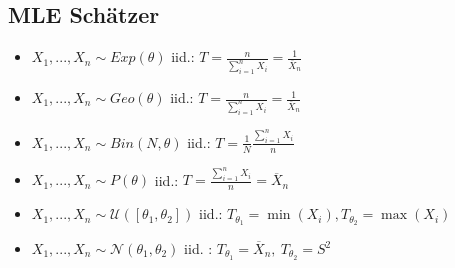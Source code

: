 \subsection{MLE Schätzer}
\begin{itemize}
	\item $X_1, ..., X_n \sim Exp(\theta)$ iid.: $T = \frac{n}{\sum_{i=1}^n X_i} = \frac{1}{\overline{X}_n}$
	\item $X_1, ..., X_n \sim Geo(\theta)$ iid.: $T = \frac{n}{\sum_{i=1}^n X_i} = \frac{1}{\overline{X}_n}$
	\item $X_1, ..., X_n \sim Bin(N, \theta)$ iid.: $T = \frac{1}{N}\frac{\sum_{i = 1}^n X_i}{n}$
	\item $X_1, ..., X_n \sim P(\theta)$ iid.: $T = \frac{\sum_{i = 1}^n X_i}{n} = \overline{X}_n$
	\item $X_1, ..., X_n \sim \mathcal{U}([\theta_1, \theta_2])$ iid.: $T_{\theta_1} = \min(X_i), T_{\theta_2} = \max(X_i)$
	\item $X_1, ..., X_n \sim \mathcal{N}(\theta_1, \theta_2)$ iid. : $T_{\theta_1} = \overline{X}_n, \ T_{\theta_2} = S^2$
\end{itemize}

\clearpage

